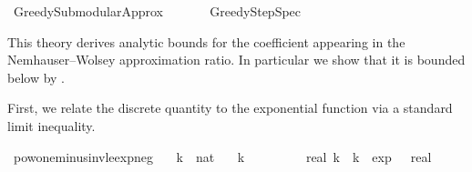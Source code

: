 %
\begin{isabellebody}%
%
%
\isadelimtheory
%
\endisadelimtheory
%
\isatagtheory
{}\isamarkupfalse%
\ Greedy{\isacharunderscore}{\kern0pt}Submodular{\isacharunderscore}{\kern0pt}Approx\isanewline
\ \ \isanewline
\ \ \ \ Greedy{\isacharunderscore}{\kern0pt}Step{\isacharunderscore}{\kern0pt}Spec\isanewline
{}%
\endisatagtheory
{\isafoldtheory}%
%
\isadelimtheory
%
\endisadelimtheory
%
\begin{isamarkuptext}%
This theory derives analytic bounds for the coefficient
   appearing in the Nemhauser–Wolsey approximation ratio.
  In particular we show that it is bounded below by .%
\end{isamarkuptext}\isamarkuptrue%
%
\begin{isamarkuptext}%
First, we relate the discrete quantity  to the exponential
  function via a standard limit inequality.%
\end{isamarkuptext}\isamarkuptrue%
\isamarkupfalse%
\ pow{\isacharunderscore}{\kern0pt}one{\isacharunderscore}{\kern0pt}minus{\isacharunderscore}{\kern0pt}inv{\isacharunderscore}{\kern0pt}le{\isacharunderscore}{\kern0pt}exp{\isacharunderscore}{\kern0pt}neg{}{\isacharcolon}{\kern0pt}\isanewline
\ \ \ k\ {\isacharcolon}{\kern0pt}{\isacharcolon}{\kern0pt}\ nat\isanewline
\ \ \ {\isachardoublequoteopen}k\ {\isasymge}\ {}{\isachardoublequoteclose}\isanewline
\ \ \ {\isachardoublequoteopen}{\isacharparenleft}{\kern0pt}{}\ {\isacharminus}{\kern0pt}\ {}\ {\isacharslash}{\kern0pt}\ real\ k{\isacharparenright}{\kern0pt}\ {\isacharcircum}{\kern0pt}\ k\ {\isasymle}\ exp\ {\isacharparenleft}{\kern0pt}{\isacharminus}{\kern0pt}{}\ {\isacharcolon}{\kern0pt}{\isacharcolon}{\kern0pt}\ real{\isacharparenright}{\kern0pt}{\isachardoublequoteclose}\isanewline

\end{isabellebody}
